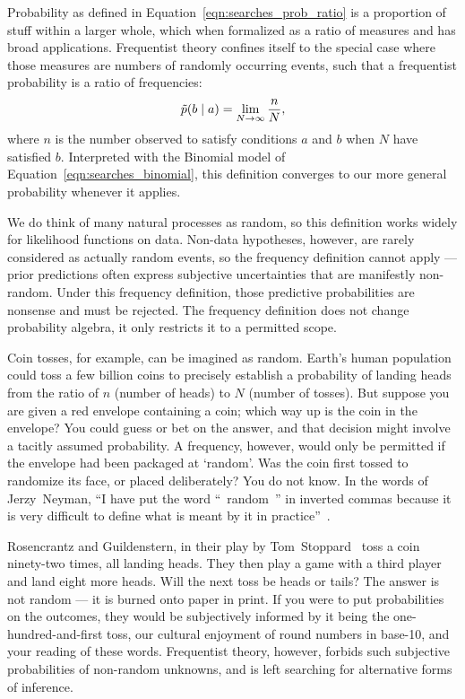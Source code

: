 Probability as defined in Equation~\ref{eqn:searches_prob_ratio} is a
proportion of stuff within a larger whole, which when formalized as a ratio
of measures and has broad applications.
Frequentist theory confines itself to the special case where those measures
are numbers of randomly occurring events, such that a frequentist
probability is a ratio of frequencies:
\begin{equation}
\label{eqn:searches_prob_frequency_ratio}
\tilde{p}(b\mid a) = \lim_{N \to \infty}\frac{n}{N},
\end{equation}
where $n$ is the number observed to satisfy conditions $a$ and $b$ when
$N$ have satisfied $b$.
Interpreted with the Binomial model of
Equation~\ref{eqn:searches_binomial}, this definition converges to our more
general probability whenever it applies.

We do think of many natural processes as random, so this definition works
widely for likelihood functions on data.
Non-data hypotheses, however, are rarely considered as actually random events,
so the frequency definition cannot apply ---
prior predictions often express subjective uncertainties that are manifestly
non-random.
Under this frequency definition, those predictive probabilities are nonsense
and must be rejected.
The frequency definition does not change probability algebra, it only restricts
it to a permitted scope.

Coin tosses, for example, can be imagined as random.
Earth's human population could toss a few billion coins to precisely
establish a probability of landing heads from the ratio of
$n$ (number of heads) to $N$ (number of tosses).
But suppose you are given a red envelope containing a coin;
which way up is the coin in the envelope?
You could guess or bet on the answer, and that decision might involve a tacitly
assumed probability.
A frequency, however, would only be permitted if the envelope had been packaged
at `random'.
Was the coin first tossed to randomize its face, or placed deliberately?
You do not know.
In the words of Jerzy~Neyman,
``I have put the word ``~random~'' in inverted commas because it is very
difficult to define what is meant by it in practice''~\cite{
Neyman1937Outline
}.

Rosencrantz and Guildenstern, in their play by Tom~Stoppard~\cite{
stoppard1967rosencrantz
}
toss a coin ninety-two times, all landing heads.
They then play a game with a third player and land eight more heads.
Will the next toss be heads or tails?
The answer is not random --- it is burned onto paper in print.
If you were to put probabilities on the outcomes, they would be subjectively
informed by it being the one-hundred-and-first toss, our cultural enjoyment
of round numbers in base-10, and your reading of these words.
Frequentist theory, however, forbids such subjective probabilities of
non-random unknowns, and is left searching for alternative forms of inference.

